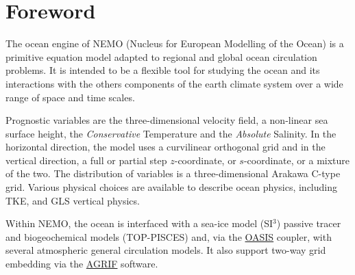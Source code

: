 \chapter*{Foreword}

The ocean engine of NEMO (Nucleus for European Modelling of the Ocean) is a primitive equation model adapted to
regional and global ocean circulation problems.
It is intended to be a flexible tool for studying the ocean and its interactions with the others components of
the earth climate system over a wide range of space and time scales.

Prognostic variables are the three-dimensional velocity field, a non-linear sea surface height,
the \textit{Conservative} Temperature and the \textit{Absolute} Salinity.
In the horizontal direction, the model uses a curvilinear orthogonal grid and in the vertical direction,
a full or partial step $z$-coordinate, or $s$-coordinate, or a mixture of the two.
The distribution of variables is a three-dimensional Arakawa C-type grid.
Various physical choices are available to describe ocean physics, including TKE, and GLS vertical physics.

Within NEMO, the ocean is interfaced with a sea-ice model (SI$^3$)
passive tracer and biogeochemical models (TOP-PISCES) and,
via the \href{https://portal.enes.org/oasis}{OASIS} coupler, with several atmospheric general circulation models.
It also support two-way grid embedding via the \href{http://agrif.imag.fr}{AGRIF} software.
